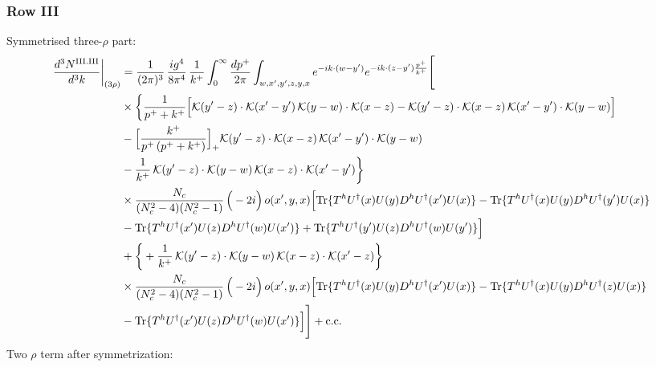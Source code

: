 \documentclass[9pt]{article}
\numberwithin{equation}{section}
\begin{document}
\subsubsection*{Row III}
Symmetrised three-$\rho$ part:
\begin{align}
\frac{d^{3}N^{\rm III.III}}{d^{3}k}\bigg|_{(3\rho)}&=\frac{1}{(2\pi)^{3}}\,\frac{ig^{4}}{8\pi^{4}}\,\frac{1}{k^{+}}\int_{0}^{\infty}\frac{dp^{+}}{2\pi}\int_{w,x',y',z,y,x}e^{-ik\cdot(w-y')}e^{-ik\cdot(z-y')\frac{p^{+}}{k^{+}}}\Bigg[\notag\\
&\times\bigg\{\frac{1}{p^{+}+k^{+}}\Big[\mathcal{K}(y'-z)\cdot\mathcal{K}(x'-y')\,\mathcal{K}(y-w)\cdot\mathcal{K}(x-z)-\mathcal{K}(y'-z)\cdot\mathcal{K}(x-z)\,\mathcal{K}(x'-y')\cdot\mathcal{K}(y-w)\Big]\notag\\
&-\Big[\frac{k^{+}}{p^{+}\,(p^{+}+k^{+})}\Big]_{+}\mathcal{K}(y'-z)\cdot\mathcal{K}(x-z)\,\mathcal{K}(x'-y')\cdot\mathcal{K}(y-w)\notag\\
&-\frac{1}{k^{+}}\,\mathcal{K}(y'-z)\cdot\mathcal{K}(y-w)\,\mathcal{K}(x-z)\cdot\mathcal{K}(x'-y')\bigg\}\notag\\
&\times \frac{N_{c}}{(N_{c}^{2}-4)(N_{c}^{2}-1)}\,\Big(-2i\Big)\,o(x',y,x)\Big[{\rm Tr}\{T^{h}U^{\dagger}(x)U(y)D^{h}U^{\dagger}(x')U(x)\}-{\rm Tr}\{T^{h}U^{\dagger}(x)U(y)D^{h}U^{\dagger}(y')U(x)\}\notag\\
& -{\rm Tr}\{T^{h}U^{\dagger}(x')U(z)D^{h}U^{\dagger}(w)U(x')\}+{\rm Tr}\{T^{h}U^{\dagger}(y')U(z)D^{h}U^{\dagger}(w)U(y')\}\Big]\notag\\
&+\bigg\{+\frac{1}{k^{+}}\,\mathcal{K}(y'-z)\cdot\mathcal{K}(y-w)\,\mathcal{K}(x-z)\cdot\mathcal{K}(x'-z)\bigg\}\notag\\
&\times \frac{N_{c}}{(N_{c}^{2}-4)(N_{c}^{2}-1)}\,\Big(-2i\Big)\,o(x',y,x)\Big[{\rm Tr}\{T^{h}U^{\dagger}(x)U(y)D^{h}U^{\dagger}(x')U(x)\}-{\rm Tr}\{T^{h}U^{\dagger}(x)U(y)D^{h}U^{\dagger}(z)U(x)\}\notag\\
& -{\rm Tr}\{T^{h}U^{\dagger}(x')U(z)D^{h}U^{\dagger}(w)U(x')\}\Big]\Bigg]+{\rm c.c.}\label{eq:E-III.III-3}
\end{align}
Two $\rho$ term after symmetrization:
\end{document}
